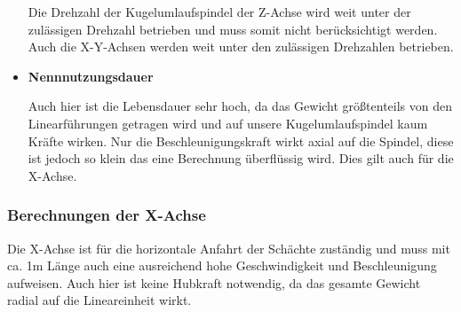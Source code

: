 \begin{itemize}
\begin{tabbing}
\end{tabbing}

Die Drehzahl der Kugelumlaufspindel der Z-Achse wird weit unter der zulässigen Drehzahl betrieben und muss somit nicht berücksichtigt werden. Auch die X-Y-Achsen werden weit unter den zulässigen Drehzahlen betrieben.



\item \textbf{Nennnutzungsdauer}


Auch hier ist die Lebensdauer sehr hoch, da das Gewicht größtenteils von den Linearführungen getragen wird und auf unsere Kugelumlaufspindel kaum Kräfte wirken. Nur die Beschleunigungskraft wirkt axial auf die Spindel, diese ist jedoch so klein das eine Berechnung überflüssig wird. Dies gilt auch für die X-Achse.


\end{itemize}








\subsubsection{Berechnungen der X-Achse}

Die X-Achse ist für die horizontale Anfahrt der Schächte zuständig und muss mit ca. 1m Länge auch eine ausreichend 
hohe Geschwindigkeit und Beschleunigung aufweisen. Auch hier ist keine Hubkraft notwendig, da das gesamte Gewicht 
radial auf die Lineareinheit wirkt. 


